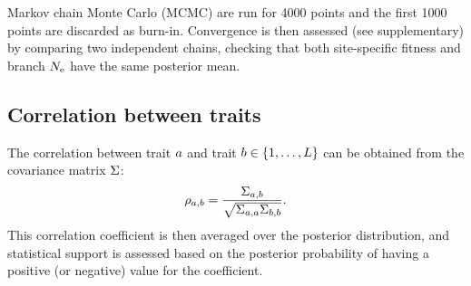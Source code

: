 Markov chain Monte Carlo (MCMC) are run for 4000 points and the first 1000 points are discarded as burn-in.
Convergence is then assessed (see supplementary) by comparing two independent chains, checking that both site-specific fitness and branch $N_{\text{e}}$ have the same posterior mean.

\subsection{Correlation between traits}
\label{sec:Correlation}
The correlation between trait $a$ and trait $b \in \{1, \hdots, L\}$ can be obtained from the covariance matrix $\Sigma$:
\begin{equation}
    \rho_{a, b} = \dfrac{\Sigma_{a, b}}{\sqrt{\Sigma_{a, a} \Sigma_{b, b}}}.
\end{equation}
This correlation coefficient is then averaged over the posterior distribution, and statistical support is assessed based on the posterior probability of having a positive (or negative) value for the coefficient.

